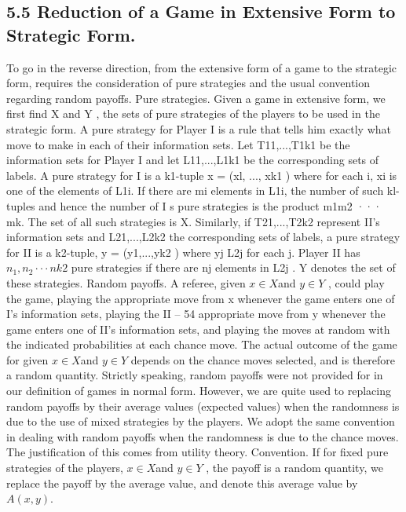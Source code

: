 \begin{framed}
\subsection{5.5 Reduction of a Game in Extensive Form to Strategic Form.} To go in
the reverse direction, from the extensive form of a game to the strategic form, requires the
consideration of pure strategies and the usual convention regarding random payoffs.
Pure strategies. Given a game in extensive form, we first find X and Y , the sets of
pure strategies of the players to be used in the strategic form. A pure strategy for Player
I is a rule that tells him exactly what move to make in each of their information sets. Let
T11,...,T1k1 be the information sets for Player I and let L11,...,L1k1 be the corresponding
sets of labels. A pure strategy for I is a k1-tuple x = (xl, ..., xk1 ) where for each i, xi is one
of the elements of L1i. If there are mi elements in L1i, the number of such kl-tuples and
hence the number of I s pure strategies is the product m1m2 ··· mk. The set of all such
strategies is X. Similarly, if T21,...,T2k2 represent II’s information sets and L21,...,L2k2
the corresponding sets of labels, a pure strategy for II is a k2-tuple, y = (y1,...,yk2 ) where
yj \in L2j for each j. Player II has $n_1,n_2 ··· nk2$ pure strategies if there are nj elements in
L2j . Y denotes the set of these strategies.
Random payoffs. A referee, given $x \in X $and $y \in Y $ , could play the game, playing the
appropriate move from x whenever the game enters one of I’s information sets, playing the
II – 54
appropriate move from y whenever the game enters one of II’s information sets, and playing
the moves at random with the indicated probabilities at each chance move. The actual
outcome of the game for given $x \in X $and $y \in Y $ depends on the chance moves selected,
and is therefore a random quantity. Strictly speaking, random payoffs were not provided
for in our definition of games in normal form. However, we are quite used to replacing
random payoffs by their average values (expected values) when the randomness is due to
the use of mixed strategies by the players. We adopt the same convention in dealing with
random payoffs when the randomness is due to the chance moves. The justification of this
comes from utility theory.
Convention. If for fixed pure strategies of the players, $x \in X $and $y \in Y $ , the payoff is
a random quantity, we replace the payoff by the average value, and denote this average
value by $A(x, y)$.

\end{framed}
